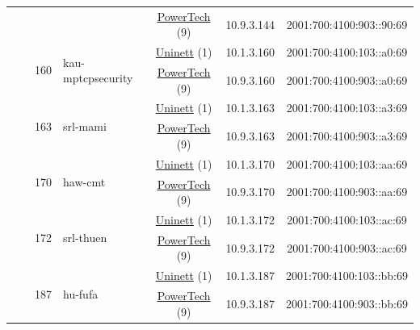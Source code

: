 \begin{small}
\begin{center}
\begin{longtable}{|c|c|c|c|c|c|c|c|}
  &  &  &  & \multicolumn{2}{|c|}{\tiny{\href{http://www.powertech.no}{PowerTech} (9)}} & \tiny{10.9.3.144} & \tiny{2001:700:4100:903::90:69} \\* \cline{3-3}\cline{4-4}\cline{5-5}\cline{6-6}\cline{7-7}\cline{8-8}
  &  & \multirow{2}{*}{\tiny{160}} & \multicolumn{1}{|l|}{\multirow{2}{*}{\tiny{kau-mptcpsecurity}}} & \multicolumn{2}{|c|}{\tiny{\href{https://www.uninett.no}{Uninett} (1)}} & \tiny{10.1.3.160} & \tiny{2001:700:4100:103::a0:69} \\* \cline{5-5}\cline{6-6}\cline{7-7}\cline{8-8}
  &  &  &  & \multicolumn{2}{|c|}{\tiny{\href{http://www.powertech.no}{PowerTech} (9)}} & \tiny{10.9.3.160} & \tiny{2001:700:4100:903::a0:69} \\* \cline{3-3}\cline{4-4}\cline{5-5}\cline{6-6}\cline{7-7}\cline{8-8}
  &  & \multirow{2}{*}{\tiny{163}} & \multicolumn{1}{|l|}{\multirow{2}{*}{\tiny{srl-mami}}} & \multicolumn{2}{|c|}{\tiny{\href{https://www.uninett.no}{Uninett} (1)}} & \tiny{10.1.3.163} & \tiny{2001:700:4100:103::a3:69} \\* \cline{5-5}\cline{6-6}\cline{7-7}\cline{8-8}
  &  &  &  & \multicolumn{2}{|c|}{\tiny{\href{http://www.powertech.no}{PowerTech} (9)}} & \tiny{10.9.3.163} & \tiny{2001:700:4100:903::a3:69} \\* \cline{3-3}\cline{4-4}\cline{5-5}\cline{6-6}\cline{7-7}\cline{8-8}
  &  & \multirow{2}{*}{\tiny{170}} & \multicolumn{1}{|l|}{\multirow{2}{*}{\tiny{haw-cmt}}} & \multicolumn{2}{|c|}{\tiny{\href{https://www.uninett.no}{Uninett} (1)}} & \tiny{10.1.3.170} & \tiny{2001:700:4100:103::aa:69} \\* \cline{5-5}\cline{6-6}\cline{7-7}\cline{8-8}
  &  &  &  & \multicolumn{2}{|c|}{\tiny{\href{http://www.powertech.no}{PowerTech} (9)}} & \tiny{10.9.3.170} & \tiny{2001:700:4100:903::aa:69} \\* \cline{3-3}\cline{4-4}\cline{5-5}\cline{6-6}\cline{7-7}\cline{8-8}
  &  & \multirow{2}{*}{\tiny{172}} & \multicolumn{1}{|l|}{\multirow{2}{*}{\tiny{srl-thuen}}} & \multicolumn{2}{|c|}{\tiny{\href{https://www.uninett.no}{Uninett} (1)}} & \tiny{10.1.3.172} & \tiny{2001:700:4100:103::ac:69} \\* \cline{5-5}\cline{6-6}\cline{7-7}\cline{8-8}
  &  &  &  & \multicolumn{2}{|c|}{\tiny{\href{http://www.powertech.no}{PowerTech} (9)}} & \tiny{10.9.3.172} & \tiny{2001:700:4100:903::ac:69} \\* \cline{3-3}\cline{4-4}\cline{5-5}\cline{6-6}\cline{7-7}\cline{8-8}
  &  & \multirow{2}{*}{\tiny{187}} & \multicolumn{1}{|l|}{\multirow{2}{*}{\tiny{hu-fufa}}} & \multicolumn{2}{|c|}{\tiny{\href{https://www.uninett.no}{Uninett} (1)}} & \tiny{10.1.3.187} & \tiny{2001:700:4100:103::bb:69} \\* \cline{5-5}\cline{6-6}\cline{7-7}\cline{8-8}
  &  &  &  & \multicolumn{2}{|c|}{\tiny{\href{http://www.powertech.no}{PowerTech} (9)}} & \tiny{10.9.3.187} & \tiny{2001:700:4100:903::bb:69} \\ \hline
\end{longtable}
\end{center}
\end{small}



